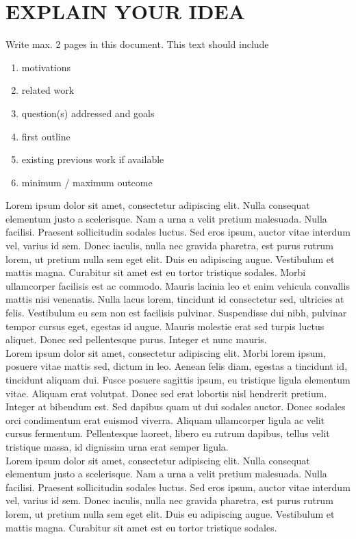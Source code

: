 \chapter{EXPLAIN YOUR IDEA}
\label{sec:intro}
Write max. 2 pages in this document. This text should include \\

\begin{enumerate}
\item motivations 
\item related work 
\item question(s) addressed and goals 
\item first outline
\item existing previous work if available  
\item minimum / maximum outcome
\end{enumerate}

Lorem ipsum dolor sit amet, consectetur adipiscing elit. Nulla consequat elementum justo a scelerisque. Nam a urna a velit pretium malesuada. Nulla facilisi. Praesent sollicitudin sodales luctus. Sed eros ipsum, auctor vitae interdum vel, varius id sem. Donec iaculis, nulla nec gravida pharetra, est purus rutrum lorem, ut pretium nulla sem eget elit. Duis eu adipiscing augue. Vestibulum et mattis magna. Curabitur sit amet est eu tortor tristique sodales. Morbi ullamcorper facilisis est ac commodo. Mauris lacinia leo et enim vehicula convallis mattis nisi venenatis. Nulla lacus lorem, tincidunt id consectetur sed, ultricies at felis. Vestibulum eu sem non est facilisis pulvinar. Suspendisse dui nibh, pulvinar tempor cursus eget, egestas id augue. Mauris molestie erat sed turpis luctus aliquet. Donec sed pellentesque purus. Integer et nunc mauris. \\
Lorem ipsum dolor sit amet, consectetur adipiscing elit. Morbi lorem ipsum, posuere vitae mattis sed, dictum in leo. Aenean felis diam, egestas a tincidunt id, tincidunt aliquam dui. Fusce posuere sagittis ipsum, eu tristique ligula elementum vitae. Aliquam erat volutpat. Donec sed erat lobortis nisl hendrerit pretium. Integer at bibendum est. Sed dapibus quam ut dui sodales auctor. Donec sodales orci condimentum erat euismod viverra. Aliquam ullamcorper ligula ac velit cursus fermentum. Pellentesque laoreet, libero eu rutrum dapibus, tellus velit tristique massa, id dignissim urna erat semper ligula. \\
Lorem ipsum dolor sit amet, consectetur adipiscing elit. Nulla consequat elementum justo a scelerisque. Nam a urna a velit pretium malesuada. Nulla facilisi. Praesent sollicitudin sodales luctus. Sed eros ipsum, auctor vitae interdum vel, varius id sem. Donec iaculis, nulla nec gravida pharetra, est purus rutrum lorem, ut pretium nulla sem eget elit. Duis eu adipiscing augue. Vestibulum et mattis magna. Curabitur sit amet est eu tortor tristique sodales. 